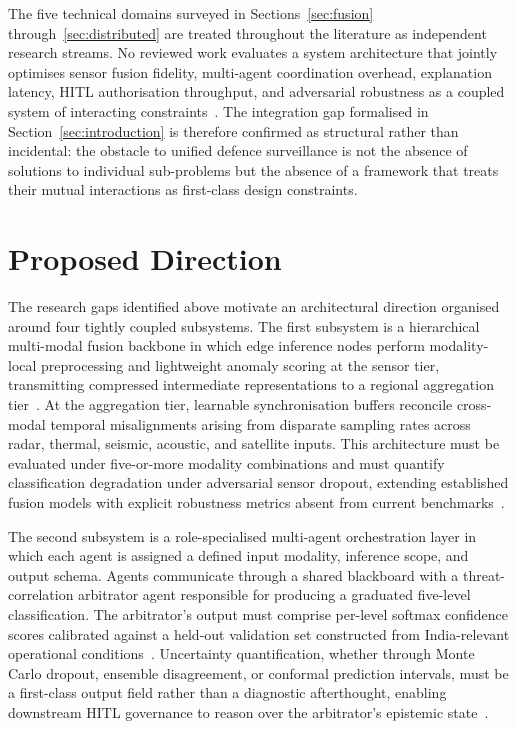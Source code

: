 The five technical domains surveyed in Sections~\ref{sec:fusion} through~\ref{sec:distributed} are treated throughout the literature as independent research streams. No reviewed work evaluates a system architecture that jointly optimises sensor fusion fidelity, multi-agent coordination overhead, explanation latency, HITL authorisation throughput, and adversarial robustness as a coupled system of interacting constraints~\cite{meng2023multisource, flink2024kafka, uavids2025drones}. The integration gap formalised in Section~\ref{sec:introduction} is therefore confirmed as structural rather than incidental: the obstacle to unified defence surveillance is not the absence of solutions to individual sub-problems but the absence of a framework that treats their mutual interactions as first-class design constraints.


\section{Proposed Direction}
\label{sec:proposed}

The research gaps identified above motivate an architectural direction organised around four tightly coupled subsystems. The first subsystem is a hierarchical multi-modal fusion backbone in which edge inference nodes perform modality-local preprocessing and lightweight anomaly scoring at the sensor tier, transmitting compressed intermediate representations to a regional aggregation tier~\cite{flink2024kafka}. At the aggregation tier, learnable synchronisation buffers reconcile cross-modal temporal misalignments arising from disparate sampling rates across radar, thermal, seismic, acoustic, and satellite inputs. This architecture must be evaluated under five-or-more modality combinations and must quantify classification degradation under adversarial sensor dropout, extending established fusion models with explicit robustness metrics absent from current benchmarks~\cite{meng2023multisource}.

The second subsystem is a role-specialised multi-agent orchestration layer in which each agent is assigned a defined input modality, inference scope, and output schema. Agents communicate through a shared blackboard with a threat-correlation arbitrator agent responsible for producing a graduated five-level classification. The arbitrator's output must comprise per-level softmax confidence scores calibrated against a held-out validation set constructed from India-relevant operational conditions~\cite{hassan2025multiagent, agenticcyber2025}. Uncertainty quantification, whether through Monte Carlo dropout, ensemble disagreement, or conformal prediction intervals, must be a first-class output field rather than a diagnostic afterthought, enabling downstream HITL governance to reason over the arbitrator's epistemic state~\cite{zhao2022deepai}.

